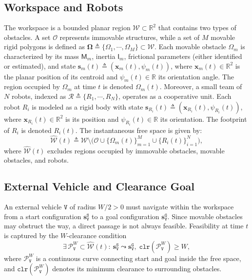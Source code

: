 \subsection{Workspace and Robots}\label{subsec:ws}
The workspace is a bounded planar region
$\mathcal{W}\subset\mathbb{R}^2$ that contains two types of
obstacles. A set $\mathcal{O}$ represents immovable structures,
while a set of $M$ movable rigid polygons is defined as
$\boldsymbol{\Omega}\triangleq\{\Omega_1,\cdots,\Omega_M\}\subset\mathcal{W}$.
Each movable obstacle $\Omega_m$ is characterized by its mass
$\mathsf{M}_m$, inertia $\mathsf{I}_m$, frictional parameters
(either identified or estimated), and state
$\mathbf{s}_m(t)\triangleq(\mathbf{x}_m(t),\psi_m(t))$,
where $\mathbf{x}_m(t)\in\mathbb{R}^2$ is the planar position of its centroid
and $\psi_m(t)\in\mathbb{R}$ its orientation angle. The region occupied by
$\Omega_m$ at time $t$ is denoted $\Omega_m(t)$.
Moreover, a small team of $N$ robots, indexed as
$\mathcal{R}\triangleq\{R_1,\cdots,R_N\}$, operates as a cooperative unit.
Each robot $R_i$ is modeled as a rigid body with state
$\mathbf{s}_{R_i}(t)\triangleq(\mathbf{x}_{R_i}(t),\psi_{R_i}(t))$,
where $\mathbf{x}_{R_i}(t)\in\mathbb{R}^2$ is its position and
$\psi_{R_i}(t)\in\mathbb{R}$ its orientation. The footprint of $R_i$ is
denoted $R_i(t)$. The instantaneous free space is given by:
\begin{equation}\label{eq:freespace}
\widehat{\mathcal{W}}(t)\triangleq\mathcal{W}\setminus\Big(
\mathcal{O}\cup\{\Omega_m(t)\}_{m=1}^{M}\cup\{R_i(t)\}_{i=1}^{N}
\Big),
\end{equation}
where $\widehat{\mathcal{W}}(t)$ excludes regions occupied by immovable
obstacles, movable obstacles, and robots.

\subsection{External Vehicle and Clearance Goal}\label{subsec:vehicle}
An external vehicle $\texttt{V}$ of radius $W/2>0$ must navigate within the workspace
from a start configuration $\mathbf{s}_\texttt{V}^{\texttt{S}}$ to a goal configuration
$\mathbf{s}_\texttt{V}^{\texttt{G}}$. Since movable obstacles may obstruct the way, a
direct passage is not always feasible. Feasibility at time $t$ is captured by
the $W$-clearance condition
\begin{equation}\label{eq:wclear}
\exists\,\mathcal{P}^W_\texttt{V}\subset\widehat{\mathcal{W}}(t):\
\mathbf{s}_\texttt{V}^{\texttt{S}}\leadsto\mathbf{s}_\texttt{V}^{\texttt{G}},\;
\texttt{clr}(\mathcal{P}^W_\texttt{V})\ge W,
\end{equation}
where $\mathcal{P}^W_\texttt{V}$ is a continuous curve connecting start and goal inside
the free space, and $\texttt{clr}(\mathcal{P}^W_\texttt{V})$ denotes its minimum clearance
to surrounding obstacles.

